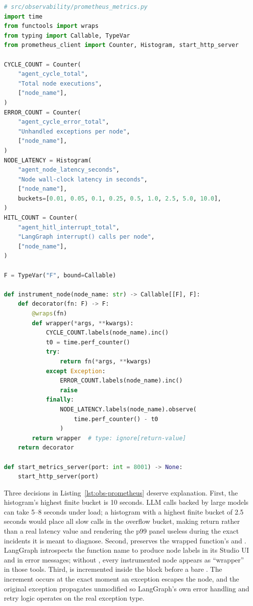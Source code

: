 \begin{lstlisting}[language=Python,
  caption={Four Prometheus instruments and the \code{instrument\_node}
  decorator},
  label={lst:obs-prometheus}]
# src/observability/prometheus_metrics.py
import time
from functools import wraps
from typing import Callable, TypeVar
from prometheus_client import Counter, Histogram, start_http_server

CYCLE_COUNT = Counter(
    "agent_cycle_total",
    "Total node executions",
    ["node_name"],
)
ERROR_COUNT = Counter(
    "agent_cycle_error_total",
    "Unhandled exceptions per node",
    ["node_name"],
)
NODE_LATENCY = Histogram(
    "agent_node_latency_seconds",
    "Node wall-clock latency in seconds",
    ["node_name"],
    buckets=[0.01, 0.05, 0.1, 0.25, 0.5, 1.0, 2.5, 5.0, 10.0],
)
HITL_COUNT = Counter(
    "agent_hitl_interrupt_total",
    "LangGraph interrupt() calls per node",
    ["node_name"],
)

F = TypeVar("F", bound=Callable)

def instrument_node(node_name: str) -> Callable[[F], F]:
    def decorator(fn: F) -> F:
        @wraps(fn)
        def wrapper(*args, **kwargs):
            CYCLE_COUNT.labels(node_name).inc()
            t0 = time.perf_counter()
            try:
                return fn(*args, **kwargs)
            except Exception:
                ERROR_COUNT.labels(node_name).inc()
                raise
            finally:
                NODE_LATENCY.labels(node_name).observe(
                    time.perf_counter() - t0
                )
        return wrapper  # type: ignore[return-value]
    return decorator

def start_metrics_server(port: int = 8001) -> None:
    start_http_server(port)
\end{lstlisting}

Three decisions in Listing~\ref{lst:obs-prometheus} deserve explanation.
First, the  histogram's highest finite bucket is
10 seconds. LLM calls backed by large models can take 5--8 seconds
under load; a histogram with a highest finite bucket of 2.5 seconds
would place all slow calls in the  overflow bucket, making
 return  rather than a
real latency value and rendering the p99 panel useless during the exact
incidents it is meant to diagnose. Second,  preserves
the wrapped function's  and .
LangGraph introspects the function name to produce node labels in its
Studio UI and in error messages; without , every
instrumented node appears as ``wrapper'' in those tools. Third,
 is incremented inside the  block
before a bare . The increment occurs at the exact moment
an exception escapes the node, and the original exception propagates
unmodified so LangGraph's own error handling and retry logic operates
on the real exception type.

